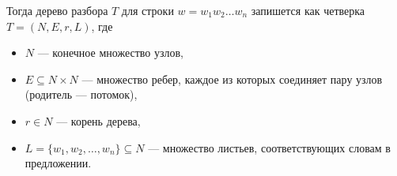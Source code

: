 Тогда дерево разбора $T$ для строки $w = w_1 w_2 \ldots w_n$ запишется как четверка $T = (N, E, r, L)$, где \begin{itemize}
    \item $N$ — конечное множество узлов,
    \item $E \subseteq N \times N$ — множество ребер, каждое из которых соединяет пару узлов (родитель — потомок),
    \item  $r \in N$ — корень дерева,
    \item $L = \{ w_1, w_2, \ldots, w_n \} \subseteq N$ — множество листьев, соответствующих словам в предложении.
\end{itemize}






